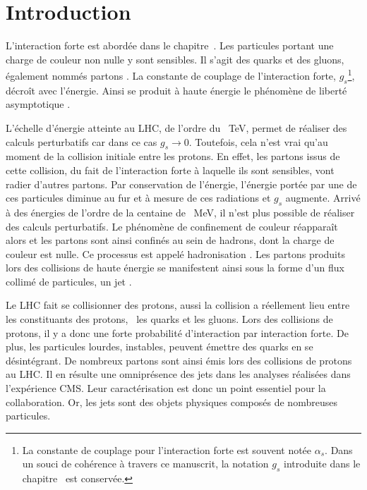 \section{Introduction}\label{chapter-JERC-section-introduction}
L'interaction forte est abordée dans le chapitre~.
Les particules portant une charge de couleur non nulle y sont sensibles.
Il s'agit des quarks et des gluons, également nommés \og partons \fg.
La constante de couplage de l'interaction forte, $g_s$\footnote{La constante de couplage pour l'interaction forte est souvent notée $\alpha_s$. Dans un souci de cohérence à travers ce manuscrit, la notation $g_s$ introduite dans le chapitre~ est conservée.}, décroît  avec l'énergie.
Ainsi se produit à haute énergie le phénomène de \og liberté asymptotique \fg.
\par L'échelle d'énergie atteinte au LHC, de l'ordre du \SI{}{\TeV}, permet de réaliser des calculs perturbatifs car dans ce cas $g_s \to 0$. Toutefois, cela n'est vrai qu'au moment de la collision initiale entre les protons.
En effet, les partons issus de cette collision, du fait de l'interaction forte à laquelle ils sont sensibles, vont radier d'autres partons.
Par conservation de l'énergie, l'énergie portée par une de ces particules diminue au fur et à mesure de ces radiations et $g_s$ augmente.
Arrivé à des énergies de l'ordre de la centaine de \SI{}{\MeV}, il n'est plus possible de réaliser des calculs perturbatifs.
Le phénomène de confinement de couleur réapparaît alors et les partons sont ainsi confinés au sein de hadrons, dont la charge de couleur est nulle.
Ce processus est appelé \og hadronisation \fg.
Les partons produits lors des collisions de haute énergie se manifestent ainsi sous la forme d'un flux collimé de particules, un \og jet \fg.
\par Le LHC fait se collisionner des protons, aussi la collision a réellement lieu entre les constituants des protons, \ie\ les quarks et les gluons.
Lors des collisions de protons, il y a donc une forte probabilité d'interaction par interaction forte.
De plus, les particules lourdes, instables, peuvent émettre des quarks en se désintégrant.
De nombreux partons sont ainsi émis lors des collisions de protons au LHC.
Il en résulte une omniprésence des jets dans les analyses réalisées dans l'expérience CMS.
Leur caractérisation est donc un point essentiel pour la collaboration.
Or, les jets sont des objets physiques composés de nombreuses particules.
